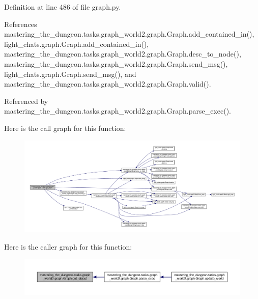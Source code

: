 Definition at line 486 of file graph.\+py.



References mastering\+\_\+the\+\_\+dungeon.\+tasks.\+graph\+\_\+world2.\+graph.\+Graph.\+add\+\_\+contained\+\_\+in(), light\+\_\+chats.\+graph.\+Graph.\+add\+\_\+contained\+\_\+in(), mastering\+\_\+the\+\_\+dungeon.\+tasks.\+graph\+\_\+world2.\+graph.\+Graph.\+desc\+\_\+to\+\_\+node(), mastering\+\_\+the\+\_\+dungeon.\+tasks.\+graph\+\_\+world2.\+graph.\+Graph.\+send\+\_\+msg(), light\+\_\+chats.\+graph.\+Graph.\+send\+\_\+msg(), and mastering\+\_\+the\+\_\+dungeon.\+tasks.\+graph\+\_\+world2.\+graph.\+Graph.\+valid().



Referenced by mastering\+\_\+the\+\_\+dungeon.\+tasks.\+graph\+\_\+world2.\+graph.\+Graph.\+parse\+\_\+exec().

Here is the call graph for this function\+:
\nopagebreak
\begin{figure}[H]
\begin{center}
\leavevmode
\includegraphics[width=350pt]{classmastering__the__dungeon_1_1tasks_1_1graph__world2_1_1graph_1_1Graph_a8bd1d9fe1ede5105100e8f9fee16cf97_cgraph}
\end{center}
\end{figure}
Here is the caller graph for this function\+:
\nopagebreak
\begin{figure}[H]
\begin{center}
\leavevmode
\includegraphics[width=350pt]{classmastering__the__dungeon_1_1tasks_1_1graph__world2_1_1graph_1_1Graph_a8bd1d9fe1ede5105100e8f9fee16cf97_icgraph}
\end{center}
\end{figure}
\mbox{\label{classmastering__the__dungeon_1_1tasks_1_1graph__world2_1_1graph_1_1Graph_adae1cb52439416a6a372d2b5fe4e7fb0}} 
